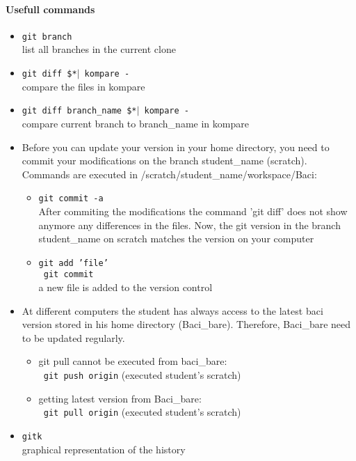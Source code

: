 \paragraph{Usefull commands}

\begin{itemize}
  \item \texttt{git branch} \\ 
  list all branches in the current clone
  \item  \texttt{git diff \$*$\mid$ kompare -} \\
  compare the files in kompare
  \item \texttt{git diff branch\_name \$*$\mid$ kompare -} \\
  compare current branch to branch\_name in kompare
  \item Before you can update your version in your home directory, you need to commit your modifications on the branch student\_name (scratch). Commands are executed in /scratch/student\_name/workspace/Baci:
  \begin{itemize}
    \item \texttt{git commit -a }\\
    After commiting the modifications the command 'git diff' does not show anymore any differences in the files. Now, the git version in the branch student\_name on scratch matches the version on your computer 
    \item \texttt{git add 'file' }\\
   \texttt{ git commit}\\
    a new file is added to the version control
  \end{itemize}
  \item At different computers the student has always access to the latest baci version stored in his home directory (Baci\_bare). Therefore, Baci\_bare need to be updated regularly.
  \begin{itemize}
    \item git pull cannot be executed from baci\_bare: \\
  \texttt{ git push origin} (executed student's scratch)
    \item getting latest version from Baci\_bare: \\
   \texttt{ git pull origin} (executed student's scratch) 
  \end{itemize}
  
  \item \texttt{gitk} \\
  graphical representation of the history
\end{itemize}



